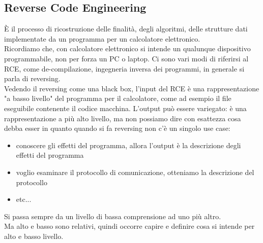 \documentclass[12pt, oneside]{extbook}
\begin{document}
\subsection{Reverse Code Engineering}
È il processo di ricostruzione delle finalità, degli algoritmi, delle strutture dati implementate da un programma per un calcolatore elettronico.\\ Ricordiamo che, con calcolatore elettronico si intende un qualunque dispositivo programmabile, non per forza un PC o laptop. Ci sono vari modi di riferirsi al RCE, come de-compilazione, ingegneria inversa dei programmi, in generale si parla di reversing.\\ Vedendo il reversing come una black box, l'input del RCE è una rappresentazione "a basso livello" del programma per il calcolatore, come ad esempio il file eseguibile contenente il codice macchina. L'output può essere variegato: è una rappresentazione a più alto livello, ma non possiamo dire con esattezza cosa debba esser in quanto quando si fa reversing non c'è un singolo use case:
\begin{itemize}
\item conoscere gli effetti del programma, allora l'output è la descrizione degli effetti del programma
\item voglio esaminare il protocollo di comunicazione, otteniamo la descrizione del protocollo
\item etc...
\end{itemize}
Si passa sempre da un livello di bassa comprensione ad uno più altro.\\ Ma alto e basso sono relativi, quindi occorre capire e definire cosa si intende per alto e basso livello.
\end{document}
